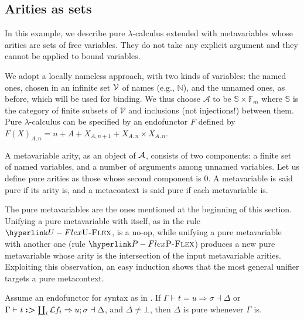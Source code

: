 \begin{full}

\subsection{Arities as sets}

In this example, we describe pure $\lambda$-calculus extended with
metavariables whose arities are sets of free variables. They do not
take any explicit argument and they cannot be applied to bound variables. 

We adopt a locally nameless approach, with two kinds of variables:
the named ones, chosen in an infinite set ${\cal V}$ of names (e.g.,
$\mathbb{N}$), and the unnamed ones, as before, which will be used
for binding. We thus choose $\mathcal{A}$ to be $\mathbb{S}\times\mathbb{F}_{m}$
where $\mathbb{S}$ is the category of finite subsets of $\mathcal{V}$
and inclusions (not injections!) between them. Pure $\lambda$-calculus
can be specified by an endofunctor $F$ defined by $F(X)_{A,n}=n+A+X_{A,n+1}+X_{A,n}\times X_{A,n}$.

A metavariable arity, as an object of ${\cal A}$, consists of two
components: a finite set of named variables, and a number of arguments
among unnamed variables. Let us define pure arities as those whose
second component is $0$. A metavariable is said pure if its arity
is, and a metacontext is said pure if each metavariable is. 

The pure metavariables are the ones mentioned at the beginning of
this section. Unifying a pure metavariable with itself, as in the
rule $\refrule{U-Flex}$, is a no-op, while unifying a pure metavariable
with another one (rule $\refrule{P-Flex}$) produces a new pure metavariable
whose arity is the intersection of the input metavariable arities.
Exploiting this observation, an easy induction shows that the most
general unifier targets a pure metacontext.
\begin{lemma}
Assume an endofunctor for syntax as in . If
$\Gamma\vdash t=u\Rightarrow\sigma\dashv\Delta$ or $\Gamma\prune t{\coprod_{i}{\cal L}f_{i}}{\sigma}u\dashv\Delta$,
and $\Delta\neq\bot$, then $\Delta$ is pure whenever $\Gamma$ is.
\end{lemma}

\end{full}
\begin{center}
\par\end{center}

